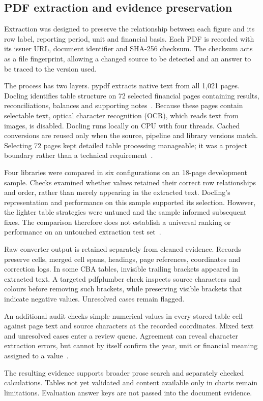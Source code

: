 \subsection{PDF extraction and evidence preservation}
\label{subsec:pdf_extraction}

Extraction was designed to preserve the relationship between each figure and its row label, reporting period, unit and financial basis. Each PDF is recorded with its issuer URL, document identifier and SHA-256 checksum. The checksum acts as a file fingerprint, allowing a changed source to be detected and an answer to be traced to the version used.

The process has two layers. pypdf extracts native text from all 1,021 pages. Docling identifies table structure on 72 selected financial pages containing results, reconciliations, balances and supporting notes~\cite{doclingSoftware}. Because these pages contain selectable text, optical character recognition (OCR), which reads text from images, is disabled. Docling runs locally on CPU with four threads. Cached conversions are reused only when the source, pipeline and library versions match. Selecting 72 pages kept detailed table processing manageable; it was a project boundary rather than a technical requirement~\cite{fintraceExtraction2026}.

Four libraries were compared in six configurations on an 18-page development sample. Checks examined whether values retained their correct row relationships and order, rather than merely appearing in the extracted text. Docling's representation and performance on this sample supported its selection. However, the lighter table strategies were untuned and the sample informed subsequent fixes. The comparison therefore does not establish a universal ranking or performance on an untouched extraction test set~\cite{fintraceExtraction2026}.

Raw converter output is retained separately from cleaned evidence. Records preserve cells, merged cell spans, headings, page references, coordinates and correction logs. In some CBA tables, invisible trailing brackets appeared in extracted text. A targeted pdfplumber check inspects source characters and colours before removing such brackets, while preserving visible brackets that indicate negative values. Unresolved cases remain flagged.

An additional audit checks simple numerical values in every stored table cell against page text and source characters at the recorded coordinates. Mixed text and unresolved cases enter a review queue. Agreement can reveal character extraction errors, but cannot by itself confirm the year, unit or financial meaning assigned to a value~\cite{fintraceExtractionFreeze2026}.

The resulting evidence supports broader prose search and separately checked calculations. Tables not yet validated and content available only in charts remain limitations. Evaluation answer keys are not passed into the document evidence.
